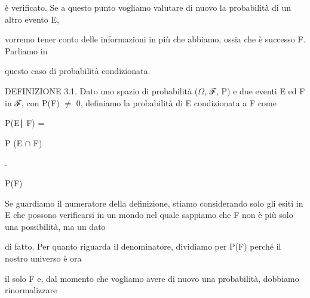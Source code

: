 \documentclass[a4paper,portrait,12pt]{article}
\begin{document}
\begin{flushleft}
\`{e} verificato. Se a questo punto vogliamo valutare di nuovo la probabilit\`{a} di un altro evento E,
\end{flushleft}


\begin{flushleft}
vorremo tener conto delle informazioni in più che abbiamo, ossia che \`{e} successo F. Parliamo in
\end{flushleft}


\begin{flushleft}
questo caso di probabilit\`{a} condizionata.
\end{flushleft}


\begin{flushleft}
DEFINIZIONE 3.1. Dato uno spazio di probabilit\`{a} ($\Omega$, ℱ, P) e due eventi E ed F in ℱ, con P(F) $\neq$ 0, definiamo la probabilit\`{a} di E condizionata a F come
\end{flushleft}


\begin{flushleft}
P(E∣ F) =
\end{flushleft}





\begin{flushleft}
P (E $\cap$ F)
\end{flushleft}


.


\begin{flushleft}
P(F)
\end{flushleft}





\begin{flushleft}
Se guardiamo il numeratore della definizione, stiamo considerando solo gli esiti in E che possono verificarsi in un mondo nel quale sappiamo che F non \`{e} più solo una possibilit\`{a}, ma un dato
\end{flushleft}


\begin{flushleft}
di fatto. Per quanto riguarda il denominatore, dividiamo per P(F) perch\'{e} il nostro universo \`{e} ora
\end{flushleft}


\begin{flushleft}
il solo F e, dal momento che vogliamo avere di nuovo una probabilit\`{a}, dobbiamo rinormalizzare
\end{flushleft}
\end{document}
